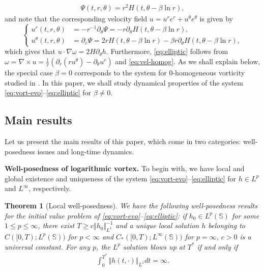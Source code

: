 \documentclass[10pt]{article}
\newtheorem{theorem}{Theorem}[section]
\theoremstyle{definition}
\theoremstyle{remark}
\numberwithin{equation}{section}
\newcommand{\nrm}[1]{\Vert#1\Vert}
\newcommand{\rd}{\partial}
\newcommand{\nb}{\nabla}
\newcommand{\0}{\emptyset}
\newcommand{\bt}{\beta}
\newcommand{\tht}{\theta}
\newcommand{\omg}{\omega}
\newcommand{\bbS}{\mathbb S}
\begin{document}
	\begin{equation}\label{eq:stream-homog}
		\begin{split}
			\Psi(t,r,\tht) = r^2 H(t, \tht - \beta \ln r ),
		\end{split}
	\end{equation} and note that the corresponding velocity field $u = u^re^r+u^\tht e^\tht$ is given by \begin{equation}\label{eq:vel-homog}
		\left\{
		\begin{aligned}
			u^r(t,r,\tht) & = -r^{-1}\rd_\tht\Psi = - r\partial_{\theta} H(t, \tht - \beta \ln r ), \\
			u^\tht(t,r,\tht) & = \rd_r\Psi = 2rH(t, \tht - \beta \ln r ) - \bt r \partial_{\theta} H(t, \tht - \beta \ln r ),
		\end{aligned}
		\right.
	\end{equation} which gives that $u\cdot\nb\omg = 2H\rd_\tht h$. Furthermore, \eqref{eq:elliptic} follows from $\omg = \nb\times u = \frac1r ( \rd_r(ru^\tht) - \rd_\tht u^r )$ and \eqref{eq:vel-homog}. As we shall explain below, the special case $\bt=0$ corresponds to the system for 0-homogeneous vorticity studied in \cite{EJ1,EMS}. In this paper, we shall study dynamical properties of the system \eqref{eq:vort-evo}--\eqref{eq:elliptic} for $\bt\ne0$. 
	
	\subsection{Main results}
	
	Let us present the main results of this paper, which come in two categories: well-posedness issues and long-time dynamics. 
	
	\medskip
	
	\noindent \textbf{Well-posedness of logarithmic vortex.} To begin with, we have local and global existence and uniqueness of the system \eqref{eq:vort-evo}--\eqref{eq:elliptic} for $h\in L^p$ and $L^\infty$, respectively. 
	\begin{theorem}[Local well-posedness]\label{thm:wp-Lp}
		We have the following well-posedness results for the initial value problem of \eqref{eq:vort-evo}--\eqref{eq:elliptic}: if $h_0 \in L^{p}(\bbS)$ for some $1\le p \le \infty$, there exist $T\ge c\nrm{h_0}_{L^{1}}^{-1}$ and a unique local solution $h$ belonging to $C([0,T);L^p(\bbS))$ for $p<\infty$ and $C_*([0,T);L^\infty(\bbS))$ for $p=\infty$, $c>0$ is a universal constant. For any $p$, the $L^p$ solution blows up at $T^*$ if and only if \begin{equation*}
			\begin{split}
				\int_0^{T^*} \nrm{h(t,\cdot)}_{L^{1}} dt = \infty. 
			\end{split}
		\end{equation*} 
	\end{theorem}
\end{document}

